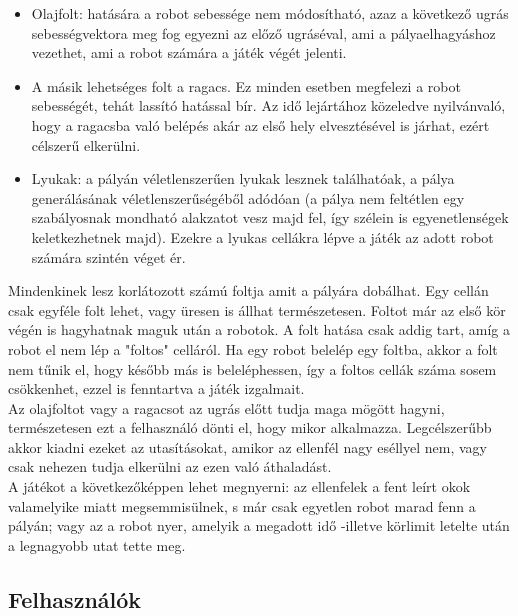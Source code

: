\begin{itemize}
	\item Olajfolt: hatására a robot sebessége nem módosítható, azaz a következő ugrás sebességvektora meg fog egyezni az előző ugráséval, ami a pályaelhagyáshoz vezethet, ami a robot számára a játék végét jelenti.
	
	\item A másik lehetséges folt a ragacs. Ez minden esetben megfelezi a robot sebességét, tehát lassító hatással bír. Az idő lejártához közeledve nyilvánvaló, hogy a ragacsba való belépés akár az első hely elvesztésével is járhat, ezért célszerű elkerülni.
	
	\item Lyukak: a pályán véletlenszerűen lyukak lesznek találhatóak, a pálya generálásának véletlenszerűségéből adódóan (a pálya nem feltétlen egy szabályosnak mondható alakzatot vesz majd fel, így szélein is egyenetlenségek keletkezhetnek majd). Ezekre a lyukas cellákra lépve a játék az adott robot számára szintén véget ér.
\end{itemize}

Mindenkinek lesz korlátozott számú foltja amit a pályára dobálhat. Egy cellán csak egyféle folt lehet, vagy üresen is állhat természetesen. Foltot már az első kör végén is hagyhatnak maguk után a robotok. A folt hatása csak addig tart, amíg a robot el nem lép a "foltos" celláról. Ha egy robot belelép egy foltba, akkor a folt nem tűnik el, hogy később más is beleléphessen, így a foltos cellák száma sosem csökkenhet, ezzel is fenntartva a játék izgalmait.\\

Az olajfoltot vagy a ragacsot az ugrás előtt tudja maga mögött hagyni, természetesen ezt a felhasználó dönti el, hogy mikor alkalmazza. Legcélszerűbb akkor kiadni ezeket az utasításokat, amikor az ellenfél nagy eséllyel nem, vagy csak nehezen tudja elkerülni az ezen való áthaladást.\\

A játékot a következőképpen lehet megnyerni: az ellenfelek a fent leírt okok valamelyike miatt megsemmisülnek, s már csak egyetlen robot marad fenn a pályán; vagy az a robot nyer, amelyik a megadott idő -illetve körlimit letelte után a legnagyobb utat tette meg.\\

\subsection{Felhasználók}

